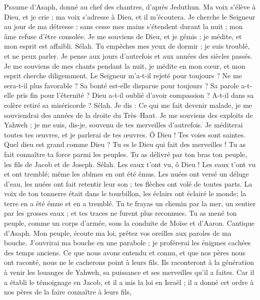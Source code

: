 \begin{multicols}{2}
\VerseOne{}Psaume d'Asaph, donné au chef des chantres, d'après Jeduthun.
Ma voix s'élève à Dieu, et je crie ; ma voix s'adresse à Dieu, et il m'écoutera.
Je cherche le Seigneur au jour de ma détresse ; sans cesse mes mains s'étendent durant la nuit ; mon âme refuse d'être consolée.
Je me souviens de Dieu, et je gémis ; je médite, et mon esprit est affaibli. Sélah.
Tu empêches mes yeux de dormir ; je suis troublé, et ne peux parler.
Je pense aux jours d'autrefois et aux années des siècles passés.
Je me souviens de mes chants pendant la nuit, je médite en mon cœur, et mon esprit cherche diligemment.
Le Seigneur m'a-t-il rejeté pour toujours ? Ne me sera-t-il plus favorable ?
Sa bonté est-elle disparue pour toujours ? Sa parole a-t-elle pris fin pour l'éternité ?
Dieu a-t-il oublié d'avoir compassion ? A-t-il dans sa colère retiré sa miséricorde ? Sélah.
Je dis : Ce qui me fait devenir malade, je me souviendrai des années de la droite du Très–Haut.
Je me souviens des exploits de Yahweh ; je me suis, dis-je, souvenu de tes merveilles d'autrefois.
Je méditerai toutes tes œuvres, et je parlerai de tes œuvres.
Ô Dieu ! Tes voies sont saintes. Quel dieu est grand comme Dieu ?
Tu es le Dieu qui fait des merveilles ! Tu as fait connaître ta force parmi les peuples.
Tu as délivré par ton bras ton peuple, les fils de Jacob et de Joseph. Sélah.
Les eaux t'ont vu, ô Dieu ! Les eaux t'ont vu et ont tremblé; même les abîmes en ont été émus.
Les nuées ont versé un déluge d'eau, les nuées ont fait retentir leur son ; tes flèches ont volé de toutes parts.
La voix de ton tonnerre était dans le tourbillon, les éclairs ont éclairé le monde; la terre en a été émue et en a tremblé.
Tu te frayas un chemin par la mer, un sentier par les grosses eaux ; et tes traces ne furent plus reconnues.
Tu as mené ton peuple, comme un corps d'armée, sous la conduite de Moïse et d'Aaron.
\VerseOne{}Cantique d'Asaph. Mon peuple, écoute ma loi, prêtez vos oreilles aux paroles de ma bouche.
J'ouvrirai ma bouche en une parabole ; je proférerai les énigmes cachées des temps anciens.
Ce que nous avons entendu et connu, et que nos pères nous ont raconté,
nous ne le cacherons point à leurs fils. Ils raconteront à la génération à venir les louanges de Yahweh, sa puissance et ses merveilles qu'il a faites.
Car il a établi le témoignage en Jacob, et il a mis la loi en Israël ; il a donné cet ordre à nos pères de la faire connaître à leurs fils,

\end{multicols}
